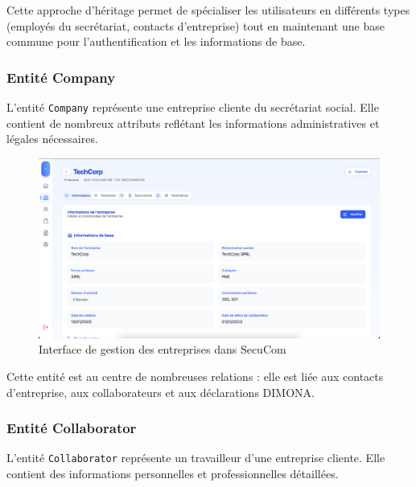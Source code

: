 \vspace{0.5cm}

\begin{note}
Cette approche d'héritage permet de spécialiser les utilisateurs en différents types (employés du secrétariat, contacts d'entreprise) tout en maintenant une base commune pour l'authentification et les informations de base.
\end{note}

\subsubsection{Entité Company}

L'entité \texttt{Company} représente une entreprise cliente du secrétariat social. Elle contient de nombreux attributs reflétant les informations administratives et légales nécessaires.

\vspace{0.5cm}

\begin{figure}[H]
  \centering
  \includegraphics[width=1\textwidth]{SecuComPreviewCompany.png}
  \caption{Interface de gestion des entreprises dans SecuCom}
  \label{fig:companyInterface}
\end{figure}

\vspace{0.5cm}

Cette entité est au centre de nombreuses relations : elle est liée aux contacts d'entreprise, aux collaborateurs et aux déclarations DIMONA.

\subsubsection{Entité Collaborator}

L'entité \texttt{Collaborator} représente un travailleur d'une entreprise cliente. Elle contient des informations personnelles et professionnelles détaillées.

